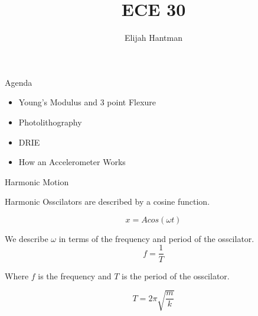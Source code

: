 \documentclass{report}
\title{\Huge{ECE 30}}
\author{\huge{Elijah Hantman}}
\date{}
\begin{document}
\maketitle
\newpage

\begin{description}
    \item {\large Agenda}
        \begin{mdframed}
            \begin{itemize}
                \item Young's Modulus and 3 point Flexure
                \item Photolithography
                \item DRIE
                \item How an Accelerometer Works
            \end{itemize}
        \end{mdframed}
    \item {\large Harmonic Motion}
        \begin{mdframed}
            Harmonic Osscilators are described by
            a cosine function.

            \begin{displaymath}
                x = Acos(\omega t)
            \end{displaymath}

            We describe $\omega$ in terms of the frequency and
            period of the osscilator.
             \begin{displaymath}
                f = \frac{1}{T}
            \end{displaymath}

            Where $f$ is the frequency and $T$ is the period of the
            osscilator.

            \begin{displaymath}
                T = 2\pi \sqrt{\frac{m}{k}}
            \end{displaymath}


\end{mdframed}
\end{description}
\end{document}
